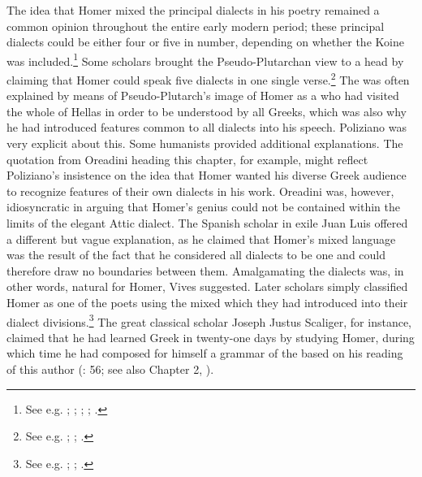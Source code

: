 The idea that Homer mixed the principal dialects in his poetry remained a common opinion throughout the entire early modern period; these principal dialects could be either four or five in number, depending on whether the Koine was included.\footnote{See e.g. \citet[\textsc{aa.}i\textsc{\textsuperscript{r}}]{Simler1512}; \citet[\textsc{a}.viii\textsc{\textsuperscript{r}}]{Liburnio1546}; \citet[xxxiv]{Lancelot1655}; \citet[20--23]{Grosch1753}; \citet[196]{Ries1786}.} Some scholars brought the Pseudo-Plutarchan view to a head by claiming that Homer could speak five dialects in one single verse.\footnote{See e.g. \citet[\textit{s.v.} “dialecte”]{Furetiere1701}; \citet[\textsc{i.}203, 3rd sequence of pagination]{Chambers1728}; \citet[934]{Dumarsais1754}.} The  was often explained by means of Pseudo-Plutarch’s image of Homer as a  who had visited the whole of Hellas in order to be understood by all Greeks, which was also why he had introduced features common to all dialects into his speech. Poliziano was very explicit about this. Some humanists provided additional explanations. The quotation from Oreadini heading this chapter, for example, might reflect Poliziano’s insistence on the idea that Homer wanted his diverse Greek audience to recognize features of their own dialects in his work. Oreadini was, however, idiosyncratic in arguing that Homer’s genius could not be contained within the limits of the elegant Attic dialect. The Spanish scholar in exile Juan Luis \citet[\textsc{x}.iiii\textsc{\textsuperscript{r}}]{Vives1533} offered a different but vague explanation, as he claimed that Homer’s mixed language was the result of the fact that he considered all dialects to be one and could therefore draw no boundaries between them. Amalgamating the dialects was, in other words, natural for Homer, Vives suggested. Later scholars simply classified Homer as one of the poets using the mixed  which they had introduced into their dialect divisions.\footnote{See e.g. \citet[6\textsc{\textsuperscript{r}}-6\textsc{\textsuperscript{v}}]{Baile1588}; \citet[333]{Alsted1630}; \citet[161]{Gesner1774}.} The great classical scholar Joseph Justus Scaliger, for instance, claimed that he had learned Greek in twenty-one days by studying Homer, during which time he had composed for himself a grammar of the  based on his reading of this author (\citealt{Scaliger1594}: 56; see also Chapter 2, ).

